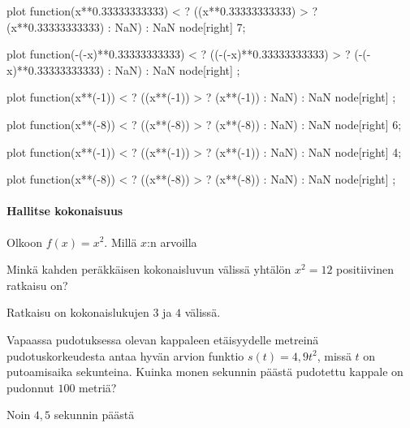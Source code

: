 \begin{tehtavasivu}
\begin{tehtava}
\begin{center}
	\begin{kuvaajapohja}{0.9}{-3.5}{3.5}{-3.5}{3.5}
	
	\newcommand{\kuvaajaneg}[3]{
\draw[smooth,color=#3,thick,domain=\kuvaajaminx:-0.01,scale=\kuvaajascale,samples=300] plot function{(#1) < \kuvaajamaxy ? ((#1) > \kuvaajaminy ? (#1) : NaN) : NaN} node[right] {#2};}
\newcommand{\kuvaajapos}[3]{
\draw[smooth,color=#3,thick,domain=0.01:\kuvaajamaxx,scale=\kuvaajascale,samples=300] plot function{(#1) < \kuvaajamaxy ? ((#1) > \kuvaajaminy ? (#1) : NaN) : NaN} node[right] {#2};}
	 \kuvaajapos{x**0.33333333333}{7}{blue}
	 \kuvaajaneg{-(-x)**0.33333333333}{}{blue}
	 \kuvaajaneg{x**(-1)}{}{violet}
	 \kuvaajaneg{x**(-8)}{6}{orange}
	 \kuvaajapos{x**(-1)}{4}{violet}
	 \kuvaajapos{x**(-8)}{}{orange}
	\end{kuvaajapohja}
\end{center}

\begin{vastaus}
\end{vastaus}

\end{tehtava}


\paragraph*{Hallitse kokonaisuus}

\begin{tehtava}
Olkoon $f(x)=x^2$. Millä $x$:n arvoilla
\begin{vastaus}
\end{vastaus}
\end{tehtava}

\begin{tehtava}
Minkä kahden peräkkäisen kokonaisluvun välissä yhtälön $x^2 = 12$ positiivinen ratkaisu on?
\begin{vastaus}
Ratkaisu on kokonaislukujen $3$ ja $4$ välissä.
\end{vastaus}
\end{tehtava}

\begin{tehtava}
Vapaassa pudotuksessa olevan kappaleen etäisyydelle metreinä pudotuskorkeudesta antaa hyvän arvion funktio $ s(t)=4,9t^{2}$, missä $t$ on putoamisaika sekunteina. Kuinka monen sekunnin päästä pudotettu kappale on pudonnut $100$ metriä?
\begin{vastaus}
Noin $4,5$ sekunnin päästä
\end{vastaus}
\end{tehtava}


\end{tehtavasivu}
